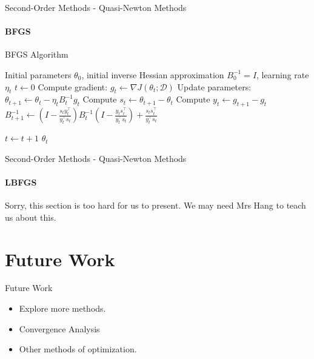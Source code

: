 \documentclass{beamer}
\begin{document}
\begin{frame}{Second-Order Methods - Quasi-Newton Methods}
\framesubtitle{BFGS}
\small
\begin{algorithm}[H]
\caption{BFGS Algorithm}
\begin{algorithmic}[1]
\Require Initial parameters $\theta_0$, 
\Require initial inverse Hessian approximation $B_0^{-1} = I$, learning rate $\eta_t$
\State $t \gets 0$
    \State Compute gradient: $g_t \gets \nabla J(\theta_t; \mathcal D)$
    \State Update parameters: $\theta_{t+1} \gets \theta_t - \eta_t B_t^{-1} g_t$
    \State Compute $s_t \gets \theta_{t+1} - \theta_t$
    \State Compute $y_t \gets g_{t+1} - g_t$
    \State 
    $B_{t+1}^{-1} \gets 
    \left(I - \frac{s_t y_t^\top}{y_t^\top s_t}\right)
    B_t^{-1}
    \left(I - \frac{y_t s_t^\top}{y_t^\top s_t}\right)
    + \frac{s_t s_t^\top}{y_t^\top s_t}$
    
    
    \State $t \gets t + 1$
\EndWhile
\State \Return $\theta_t$
\end{algorithmic}
\end{algorithm}
\end{frame}


\begin{frame}{Second-Order Methods - Quasi-Newton Methods}
\framesubtitle{LBFGS}
Sorry, this section is too hard for us to present. We may need Mrs Hang to teach us about this. 
\end{frame}

\section{Future Work}
\begin{frame}{Future Work}
	\begin{itemize}
		\item Explore more methods.
		\item Convergence Analysis
		\item Other methods of optimization.
	\end{itemize}
\end{frame}
\end{document}
